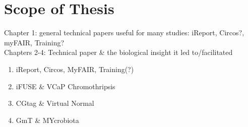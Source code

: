 \chapter*{Scope of Thesis}

Chapter 1: general technical papers useful for many studies: iReport, Circos?, myFAIR, Training? \\
Chapters 2-4: Technical paper \& the biological insight it led to/facilitated \\

\begin{enumerate}
    \item iReport, Circos, MyFAIR, Training(?)
    \item iFUSE \& VCaP Chromothripsis
    \item CGtag \& Virtual Normal
    \item GmT \& MYcrobiota
\end{enumerate}
